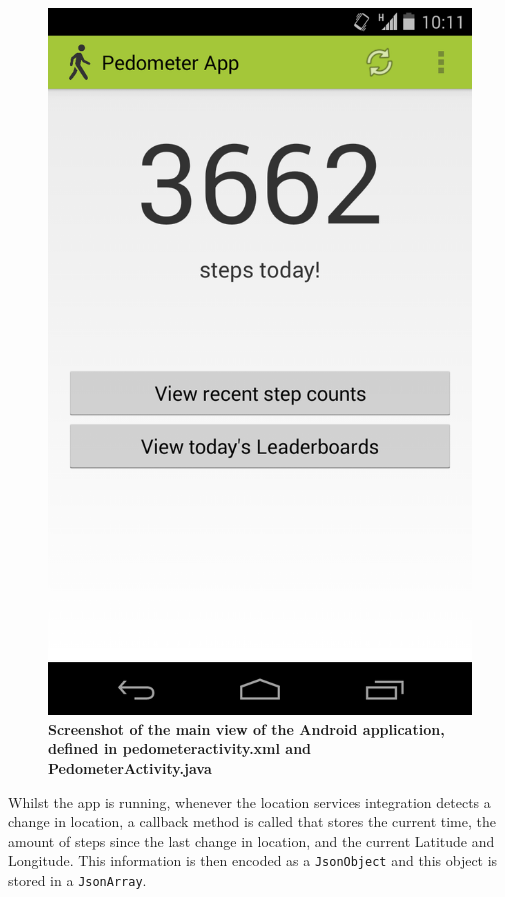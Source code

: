 \documentclass{l4proj}
\begin{document}
\begin{figure}[H]
\centering
\includegraphics[scale=0.3]{images/screenshots/appscreen.png}
\caption{\textbf{Screenshot of the main view of the Android application, defined in pedometeractivity.xml and PedometerActivity.java}}
\label{impl:dia2}
\end{figure}

Whilst the app is running, whenever the location services integration detects a change in location, a callback method is called that stores the current time, the amount of steps since the last change in location, and the current Latitude and Longitude. This information is then encoded as a \texttt{JsonObject} and this object is stored in a \texttt{JsonArray}. 
\end{document}
